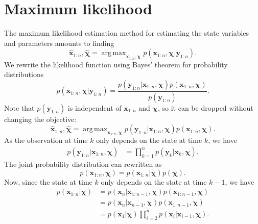 \documentclass[preprint,12pt]{elsarticle}
\let\vec\bm
\def\param{\vec{\chi}}
\DeclareMathOperator*{\argmax}{arg\,max}
\numberwithin{equation}{section}
\begin{document}
\section{Maximum likelihood}
\label{appendix:maximum_likelihood}
The maximum likelihood estimation method for estimating the state variables and parameters amounts to finding
\begin{equation}
    \hat{\vec{x}}_{1:n}, \hat{\param} = \argmax_{\vec{x}_{1:n}, \param} p(\vec{x}_{1:n}, \param | \vec{y}_{1:n}).
\end{equation}
We rewrite the likelihood function using Bayes' theorem for probability distributions
\begin{equation}
    \label{eq:bayes}
    p(\vec{x}_{1:n}, \param | \vec{y}_{1:n}) = \frac{p(\vec{y}_{1:n} | \vec{x}_{1:n}, \param) p(\vec{x}_{1:n}, \param)}{p(\vec{y}_{1:n})}.
\end{equation}
Note that $p(\vec{y}_{1:n})$ is independent of $\vec{x}_{1:n}$ and $\param$, so it can be dropped without changing the objective:
\begin{equation}
    \hat{\vec{x}}_{1:n}, \hat{\param} = \argmax_{\vec{x}_{1:n}, \param} p(\vec{y}_{1:n} | \vec{x}_{1:n}, \param) p(\vec{x}_{1:n}, \param).
\end{equation}
As the observation at time $k$ only depends on the state at time $k$, we have
\begin{equation}
    \label{eq:observations_prob_dist}
    \begin{aligned}
        p(\vec{y}_{1:n} | \vec{x}_{1:n}, \param) & =  \prod_{k=1}^n p(\vec{y}_k| \vec{x}_k, \param).
    \end{aligned}
\end{equation}
The joint probability distribution can rewritten as
\begin{equation}
    p(\vec{x}_{1:n}, \param) = p(\vec{x}_{1:n} | \param) p(\param).
\end{equation}
Now, since the state at time $k$ only depends on the state at time $k-1$, we have
\begin{equation}
    \begin{aligned}
        p(\vec{x}_{1:n} | \param) & = p(\vec{x}_n | \vec{x}_{1:n-1}, \param) p(\vec{x}_{1:n-1}, \param)       \\
                            & = p(\vec{x}_n | \vec{x}_{n-1}, \param) p (\vec{x}_{1:n-1}, \param)        \\
                            & = p(\vec{x}_1 | \param)\prod_{i=2}^n p(\vec{x}_i| \vec{x}_{i-1}, \param).
    \end{aligned}
\end{equation}
\end{document}
